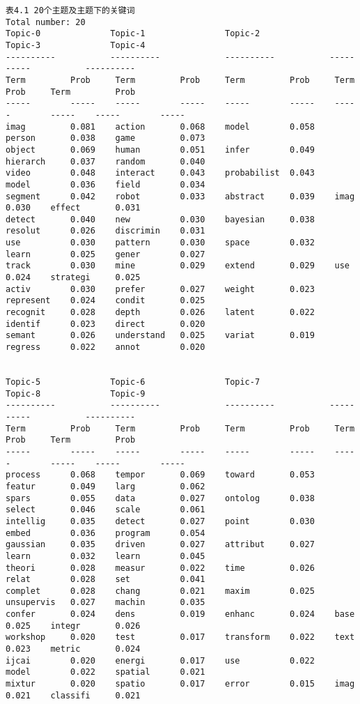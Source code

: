 \documentclass[11pt]{article}
\begin{document}
    \begin{Verbatim}[commandchars=\\\{\}]
                                  表4.1 20个主题及主题下的关键词               
Total number: 20
Topic-0              Topic-1                Topic-2              Topic-3              Topic-4               
----------           ----------             ----------           ----------           ----------            
Term         Prob     Term         Prob     Term         Prob     Term         Prob     Term         Prob    
-----        -----    -----        -----    -----        -----    -----        -----    -----        -----   
imag         0.081    action       0.068    model        0.058    person       0.038    game         0.073   
object       0.069    human        0.051    infer        0.049    hierarch     0.037    random       0.040   
video        0.048    interact     0.043    probabilist  0.043    model        0.036    field        0.034   
segment      0.042    robot        0.033    abstract     0.039    imag         0.030    effect       0.031   
detect       0.040    new          0.030    bayesian     0.038    resolut      0.026    discrimin    0.031   
use          0.030    pattern      0.030    space        0.032    learn        0.025    gener        0.027   
track        0.030    mine         0.029    extend       0.029    use          0.024    strategi     0.025   
activ        0.030    prefer       0.027    weight       0.023    represent    0.024    condit       0.025   
recognit     0.028    depth        0.026    latent       0.022    identif      0.023    direct       0.020   
semant       0.026    understand   0.025    variat       0.019    regress      0.022    annot        0.020   


Topic-5              Topic-6                Topic-7              Topic-8              Topic-9               
----------           ----------             ----------           ----------           ----------            
Term         Prob     Term         Prob     Term         Prob     Term         Prob     Term         Prob    
-----        -----    -----        -----    -----        -----    -----        -----    -----        -----   
process      0.068    tempor       0.069    toward       0.053    featur       0.049    larg         0.062   
spars        0.055    data         0.027    ontolog      0.038    select       0.046    scale        0.061   
intellig     0.035    detect       0.027    point        0.030    embed        0.036    program      0.054   
gaussian     0.035    driven       0.027    attribut     0.027    learn        0.032    learn        0.045   
theori       0.028    measur       0.022    time         0.026    relat        0.028    set          0.041   
complet      0.028    chang        0.021    maxim        0.025    unsupervis   0.027    machin       0.035   
confer       0.024    dens         0.019    enhanc       0.024    base         0.025    integr       0.026   
workshop     0.020    test         0.017    transform    0.022    text         0.023    metric       0.024   
ijcai        0.020    energi       0.017    use          0.022    model        0.022    spatial      0.021   
mixtur       0.020    spatio       0.017    error        0.015    imag         0.021    classifi     0.021   


\end{Verbatim}
\end{document}
